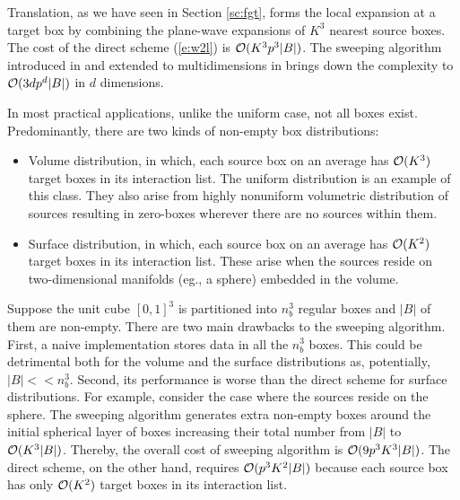 Translation, as we have seen in Section \ref{sc:fgt}, forms the local expansion at a target box by combining the plane-wave expansions of $K^3$ nearest source boxes.  The cost of the direct scheme (\ref{e:w2l}) is $\mathcal{O}(K^3 p^3 |B|)$. The sweeping algorithm introduced in \cite{greengard98} and extended to multidimensions in \cite{fggt} brings down the complexity to $\mathcal{O}(3dp^d |B|)$ in $d$ dimensions. 


In most practical applications, unlike the uniform case, not all boxes exist. Predominantly, there are two kinds of non-empty box distributions:
%
\begin{itemize}
 \item Volume distribution, in which, each source box on an average has $\mathcal{O}(K^3)$ target boxes in its interaction list. The uniform distribution is an example of this class. They also arise from highly nonuniform volumetric distribution of sources resulting in zero-boxes wherever there are no sources within them. 
 
 \item Surface distribution, in which, each source box on an average has $\mathcal{O}(K^2)$ target boxes in its interaction list. These arise when the sources reside on two-dimensional manifolds (eg., a sphere) embedded in the volume. 
\end{itemize}
%   
% 

%

Suppose the unit cube $[0, 1]^3$ is partitioned into $n_b^3$ regular boxes and $|B|$ of them are non-empty. There are two main drawbacks to the sweeping algorithm. First, a naive implementation stores data in all the $n_b^3$ boxes. This could be detrimental both for the volume and the surface distributions as, potentially, $|B| <\!< n_b^3$. Second, its performance is worse than the direct scheme for surface distributions. For example, consider the case where the sources reside on the sphere. The sweeping algorithm generates extra non-empty boxes around the initial spherical layer of boxes increasing their total number from $|B|$ to $\mathcal{O}(K^3 |B|)$. Thereby, the overall cost of sweeping algorithm is $\mathcal{O}(9 p^3 K^3 |B|)$. The direct scheme, on the other hand, requires $\mathcal{O}(p^3 K^2 |B|)$ because each source box has only $\mathcal{O}(K^2)$ target boxes in its interaction list. 


